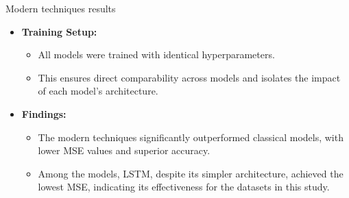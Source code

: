 \documentclass[aspectratio=16 9,10pt]{beamer}
\begin{document}
\begin{frame}{Modern techniques results}
    \begin{itemize}
        \item \textbf{Training Setup:}
        \begin{itemize}
            \item All models were trained with identical hyperparameters.
            \item This ensures direct comparability across models and isolates the impact of each model's architecture.
        \end{itemize}

        \item \textbf{Findings:}
        \begin{itemize}
            \item The modern techniques significantly outperformed classical models, with lower MSE values and superior accuracy.
            \item Among the models, LSTM, despite its simpler architecture, achieved the lowest MSE, indicating its effectiveness for the datasets in this study.
        \end{itemize}
    \end{itemize}
\end{frame}
\end{document}
